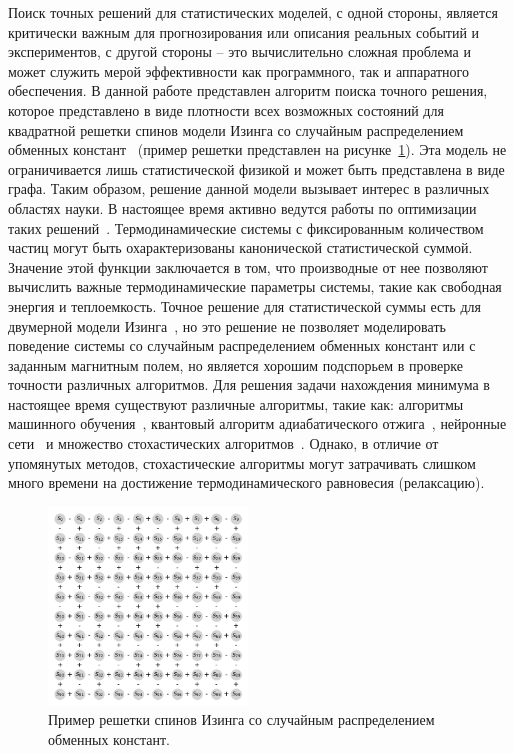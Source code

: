 \documentclass[10pt]{article}
\begin{document}
	Поиск точных решений для статистических моделей, с одной стороны, является критически важным для прогнозирования или описания реальных событий и экспериментов, с другой стороны – это вычислительно сложная проблема и может служить мерой эффективности как программного, так и аппаратного обеспечения. 
	В данной работе представлен алгоритм поиска точного решения, которое представлено в виде плотности всех возможных состояний для квадратной решетки спинов модели Изинга со случайным распределением обменных констант~\cite{roma2010ground, katzgraber2005correlation} (пример решетки представлен на рисунке~\ref{fig1}). Эта модель не ограничивается лишь статистической физикой и может быть представлена в виде графа. Таким образом, решение данной модели вызывает интерес в различных областях науки. В настоящее время активно ведутся работы по оптимизации таких решений~\cite{romero2020high}.
	Термодинамические системы с фиксированным количеством частиц могут быть охарактеризованы канонической статистической суммой. Значение этой функции заключается в том, что производные от нее позволяют вычислить важные термодинамические параметры системы, такие как свободная энергия и теплоемкость. Точное решение для статистической суммы есть для двумерной модели Изинга~\cite{onsager1944crystal}, но это решение не позволяет моделировать поведение системы со случайным распределением обменных констант или с заданным магнитным полем, но является хорошим подспорьем в проверке точности различных алгоритмов. Для решения задачи нахождения минимума в настоящее время существуют различные алгоритмы, такие как: алгоритмы машинного обучения~\cite{maren1991logical}, квантовый алгоритм адиабатического отжига~\cite{grant2020adiabatic}, нейронные сети~\cite{Korol2021} и множество стохастических алгоритмов~\cite{janke2008monte}. Однако, в отличие от упомянутых методов, стохастические алгоритмы могут затрачивать слишком много времени на достижение термодинамического равновесия (релаксацию).
	
	\begin{figure}[tbp!]
		\begin{center}
			\includegraphics[width=200px]{EA_model}
			\caption {Пример решетки спинов Изинга со случайным распределением обменных констант.}
			\label{fig1}
		\end{center}
	\end{figure}
	
\end{document}
